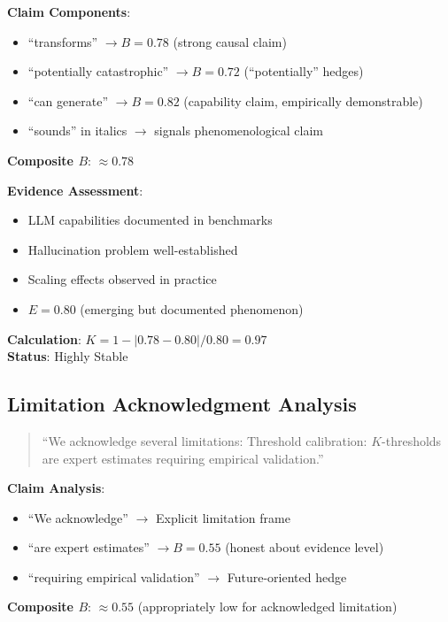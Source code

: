 \documentclass[11pt,a4paper]{article}
\begin{document}
\textbf{Claim Components}:
\begin{itemize}
    \item ``transforms'' $\to B = 0.78$ (strong causal claim)
    \item ``potentially catastrophic'' $\to B = 0.72$ (``potentially'' hedges)
    \item ``can generate'' $\to B = 0.82$ (capability claim, empirically demonstrable)
    \item ``sounds'' in italics $\to$ signals phenomenological claim
\end{itemize}

\textbf{Composite $B$}: $\approx 0.78$

\textbf{Evidence Assessment}:
\begin{itemize}
    \item LLM capabilities documented in benchmarks
    \item Hallucination problem well-established
    \item Scaling effects observed in practice
    \item $E = 0.80$ (emerging but documented phenomenon)
\end{itemize}

\textbf{Calculation}: $K = 1 - |0.78 - 0.80| / 0.80 = 0.97$ \\
\textbf{Status}: \textcolor{green!60!black}{Highly Stable}

\subsection{Limitation Acknowledgment Analysis}

\begin{quote}
``We acknowledge several limitations: Threshold calibration: $K$-thresholds are expert estimates requiring empirical validation.''
\end{quote}

\textbf{Claim Analysis}:
\begin{itemize}
    \item ``We acknowledge'' $\to$ Explicit limitation frame
    \item ``are expert estimates'' $\to B = 0.55$ (honest about evidence level)
    \item ``requiring empirical validation'' $\to$ Future-oriented hedge
\end{itemize}

\textbf{Composite $B$}: $\approx 0.55$ (appropriately low for acknowledged limitation)
\end{document}
